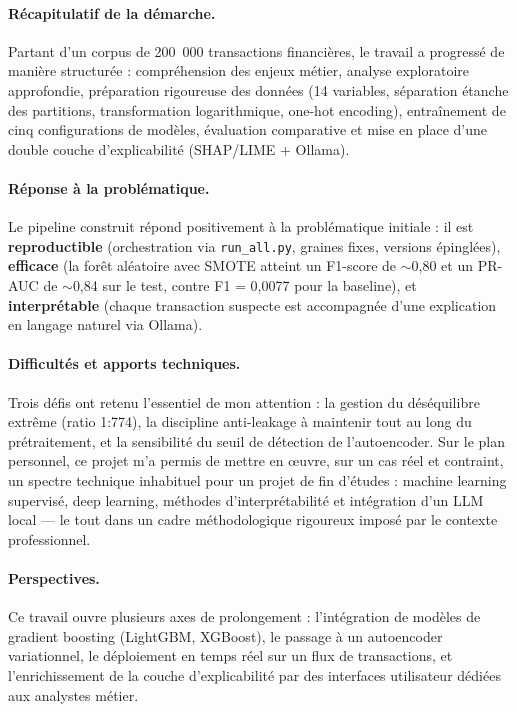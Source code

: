 \documentclass[12pt,a4paper,twoside]{report}
\begin{document}
\paragraph{Récapitulatif de la démarche.} Partant d'un corpus de 200~000 transactions
financières, le travail a progressé de manière structurée : compréhension des enjeux
métier, analyse exploratoire approfondie, préparation rigoureuse des données (14 variables,
séparation étanche des partitions, transformation logarithmique, one-hot encoding),
entraînement de cinq configurations de modèles, évaluation comparative et mise en place
d'une double couche d'explicabilité (SHAP/LIME + Ollama).

\paragraph{Réponse à la problématique.} Le pipeline construit répond positivement à la
problématique initiale : il est \textbf{reproductible} (orchestration via \texttt{run\_all.py},
graines fixes, versions épinglées), \textbf{efficace} (la forêt aléatoire avec SMOTE
atteint un F1-score de $\sim$0,80 et un PR-AUC de $\sim$0,84 sur le test, contre
F1 = 0,0077 pour la baseline), et \textbf{interprétable} (chaque transaction suspecte est
accompagnée d'une explication en langage naturel via Ollama).

\paragraph{Difficultés et apports techniques.} Trois défis ont retenu l'essentiel de mon
attention : la gestion du déséquilibre extrême (ratio 1:774), la discipline anti-leakage
à maintenir tout au long du prétraitement, et la sensibilité du seuil de détection de
l'autoencoder. Sur le plan personnel, ce projet m'a permis de mettre en œuvre, sur un cas
réel et contraint, un spectre technique inhabituel pour un projet de fin d'études : machine
learning supervisé, deep learning, méthodes d'interprétabilité et intégration d'un LLM
local --- le tout dans un cadre méthodologique rigoureux imposé par le contexte professionnel.

\paragraph{Perspectives.} Ce travail ouvre plusieurs axes de prolongement : l'intégration
de modèles de gradient boosting (LightGBM, XGBoost), le passage à un autoencoder
variationnel, le déploiement en temps réel sur un flux de transactions, et l'enrichissement
de la couche d'explicabilité par des interfaces utilisateur dédiées aux analystes métier.
\end{document}
